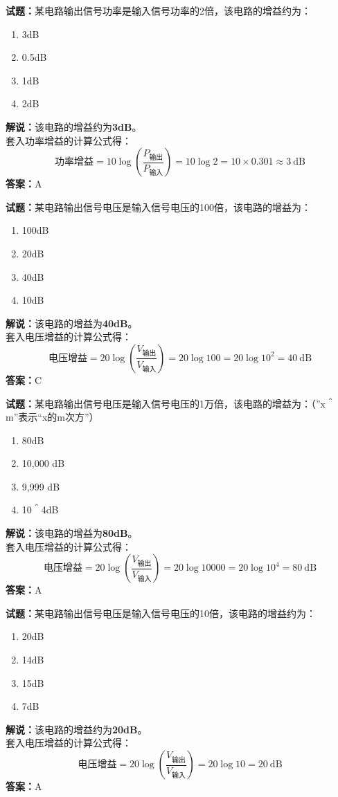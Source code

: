 \documentclass{ctexbook}
\begin{document}
\bigskip


\noindent\textbf{试题：}某电路输出信号功率是输入信号功率的2倍，该电路的增益约为：
\begin{enumerate}[leftmargin=3em]
\item 3dB
\item 0.5dB
\item 1dB
\item 2dB
\end{enumerate}
\noindent\textbf{解说：}该电路的增益约为\textbf{3dB}。\\
套入功率增益的计算公式得：
$$\mbox{功率增益}=10 \log \left( {\frac{P_{ \mbox{输出} }}{P_{ \mbox{输入} }}} \right)=10 \log 2 = 10 \times 0.301 \approx 3 \ \mathrm{dB}$$
\noindent\textbf{答案：}A




\bigskip


\noindent\textbf{试题：}某电路输出信号电压是输入信号电压的100倍，该电路的增益为：
\begin{enumerate}[leftmargin=3em]
\item 100dB
\item 20dB
\item 40dB
\item 10dB
\end{enumerate}
\noindent\textbf{解说：}该电路的增益为\textbf{40dB}。\\
套入电压增益的计算公式得：
$$\mbox{电压增益}=20 \log \left( {\frac{V_{ \mbox{输出} }}{V_{ \mbox{输入} }}} \right)=20 \log 100=20 \log 10^2= 40 \ \mathrm{dB}$$
\noindent\textbf{答案：}C




\bigskip


\noindent\textbf{试题：}某电路输出信号电压是输入信号电压的1万倍，该电路的增益为：（”x＾m”表示“x的m次方”）
\begin{enumerate}[leftmargin=3em]
\item 80dB
\item 10,000 dB
\item 9,999 dB
\item 10＾4dB
\end{enumerate}
\noindent\textbf{解说：}该电路的增益为\textbf{80dB}。\\
套入电压增益的计算公式得：
$$\mbox{电压增益}=20 \log \left( {\frac{V_{ \mbox{输出} }}{V_{ \mbox{输入} }}} \right)=20 \log 10000=20 \log 10^4= 80 \ \mathrm{dB}$$
\noindent\textbf{答案：}A



\bigskip


\noindent\textbf{试题：}某电路输出信号电压是输入信号电压的10倍，该电路的增益约为：
\begin{enumerate}[leftmargin=3em]
\item 20dB
\item 14dB
\item 15dB
\item 7dB
\end{enumerate}
\noindent\textbf{解说：}该电路的增益约为\textbf{20dB}。\\
套入电压增益的计算公式得：
$$\mbox{电压增益}=20 \log \left( {\frac{V_{ \mbox{输出} }}{V_{ \mbox{输入} }}} \right)=20 \log 10=20 \ \mathrm{dB}$$
\noindent\textbf{答案：}A
\end{document}
